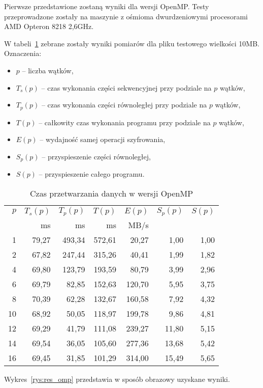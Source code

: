 \documentclass[a4paper,12pt]{article}
\begin{document}
Pierwsze przedstawione zostaną wyniki dla wersji OpenMP. Testy przeprowadzone 
zostały na maszynie z ośmioma dwurdzeniowymi procesorami AMD Opteron 8218 2,6GHz.

W tabeli~\ref{tab:omp}
zebrane zostały wyniki pomiarów dla pliku testowego wielkości 10MB. Oznaczenia:
\begin{itemize}
\item $p$ -- liczba wątków,
\item $T_s(p)$ -- czas wykonania części sekwencyjnej przy podziale na $p$ wątków,
\item $T_p(p)$ -- czas wykonania części równoległej przy podziale na $p$ wątków,
\item $T(p)$ -- całkowity czas wykonania programu przy podziale na $p$ wątków,
\item $E(p)$ -- wydajność samej operacji szyfrowania,
\item $S_p(p)$ -- przyspieszenie części równoległej,
\item $S(p)$ -- przyspieszenie całego programu.
\end{itemize}


\begin{table}[h!]
\caption{Czas przetwarzania danych w wersji OpenMP}
\centering
\footnotesize
\begin{tabular}{rrrrrrr}
\toprule
$p$&$T_s(p)$&$T_p(p)$&$T(p)$&$E(p)$&$S_p(p)$&$S(p)$\\
\cmidrule{1-7}
&ms&ms&ms&MB/s&&\\
\midrule
 1 & 79,27 & 493,34 & 572,61 &  20,27 &  1,00 & 1,00\\
 2 & 67,82 & 247,44 & 315,26 &  40,41 &  1,99 & 1,82\\
 4 & 69,80 & 123,79 & 193,59 &  80,79 &  3,99 & 2,96\\
 6 & 69,79 &  82,85 & 152,63 & 120,70 &  5,95 & 3,75\\
 8 & 70,39 &  62,28 & 132,67 & 160,58 &  7,92 & 4,32\\
10 & 68,92 &  50,05 & 118,97 & 199,78 &  9,86 & 4,81\\
12 & 69,29 &  41,79 & 111,08 & 239,27 & 11,80 & 5,15\\
14 & 69,54 &  36,05 & 105,60 & 277,36 & 13,68 & 5,42\\
16 & 69,45 &  31,85 & 101,29 & 314,00 & 15,49 & 5,65\\
\bottomrule
\end{tabular}
\label{tab:omp}
\end{table}

Wykres~\ref{rys:res_omp} przedstawia w sposób obrazowy uzyskane wyniki.
\end{document}
